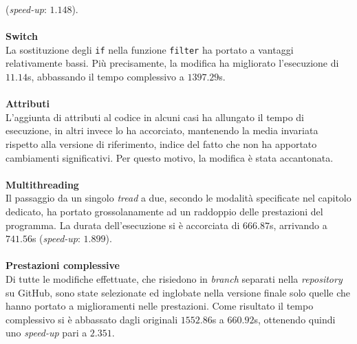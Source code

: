   (\textit{speed-up}: $1.148$).
\\ \\
\textbf{Switch}\\
  La sostituzione degli \verb|if| nella funzione \verb|filter| ha portato a 
  vantaggi relativamente bassi. Più precisamente, la modifica ha migliorato 
  l'esecuzione di $11.14$s, abbassando il tempo complessivo a $1397.29$s.
\\ \\
\textbf{Attributi}\\
  L'aggiunta di attributi al codice in alcuni casi ha allungato il tempo di 
  esecuzione, in altri invece lo ha accorciato, mantenendo la media invariata 
  rispetto alla versione di riferimento, 
  indice del fatto che non ha apportato cambiamenti significativi. 
  Per questo motivo, la modifica è stata accantonata.
\\ \\
\textbf{Multithreading}\\
  Il passaggio da un singolo \emph{tread} a due, secondo le modalità 
  specificate nel capitolo dedicato, ha portato grossolanamente ad un raddoppio 
  delle prestazioni del programma. La durata dell'esecuzione si è accorciata di 
  $666.87$s, arrivando a $741.56$s (\textit{speed-up}: $1.899$).
\\ \\
\textbf{Prestazioni complessive}\\
  Di tutte le modifiche effettuate, che risiedono in \textit{branch} separati 
  nella \textit{repository} su GitHub, sono state selezionate ed inglobate 
  nella versione finale solo 
  quelle che hanno portato a miglioramenti nelle prestazioni.
  Come risultato il tempo complessivo si è abbassato dagli originali 
  $1552.86$s a $660.92$s, ottenendo quindi uno \textit{speed-up} pari a $2.351$.
  


